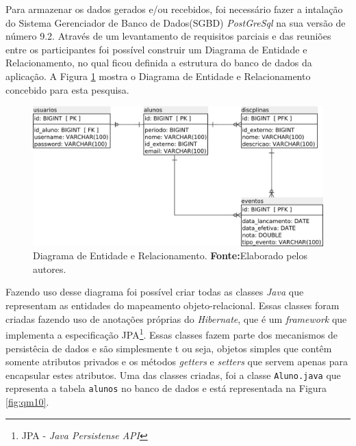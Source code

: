 		\par Para armazenar os dados gerados e/ou recebidos, foi necessário fazer a
	intalação do Sistema Gerenciador de Banco de Dados(SGBD) \textit{PostGreSql} na
	sua versão de número 9.2. Através de um levantamento de requisitos parciais e das
	reuniões entre os participantes foi possível construir um Diagrama de Entidade
	e Relacionamento, no qual ficou definida a estrutura do banco de dados da
	aplicação. A Figura \ref{fig:qm9} mostra o Diagrama de Entidade e
	Relacionamento concebido para esta pesquisa.

		\begin{figure}[h!]
			\centerline{\includegraphics[scale=0.4]{./imagens/2_q_metodologico/qm9.png}}
			\caption[Diagrama de Entidade e Relacionamento]{Diagrama de Entidade e
			Relacionamento.
			\textbf{Fonte:}Elaborado pelos autores.}
			\label{fig:qm9}
		\end{figure}

		\par Fazendo uso desse diagrama foi possível criar todas as classes 
	\textit{Java} que representam as entidades do mapeamento objeto-relacional. 
	Essas classes foram criadas fazendo uso de anotações próprias do
	\textit{Hibernate}, que é um \textit{framework} que implementa a especificação
	JPA\footnote{JPA - \textit{Java Persistense API}}. Essas classes fazem parte
	dos mecanismos de persistêcia de dados e são simplesmente t ou seja, objetos
	simples que contêm somente atributos privados e os métodos \textit{getters} e
	\textit{setters} que servem apenas para encapsular estes atributos. Uma das
	classes criadas, foi a classe \texttt{Aluno.java} que representa a tabela
	\texttt{alunos} no banco de dados e está representada na Figura
	\ref{fig:qm10}.%
	
